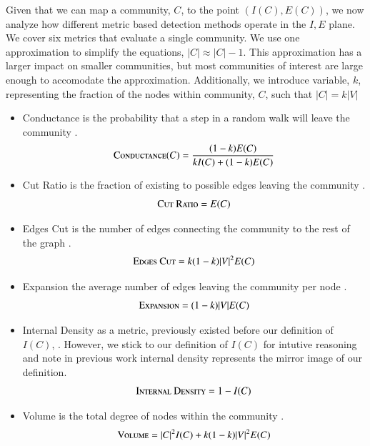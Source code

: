 \documentclass[phd,tocprelim]{cornell}
\begin{document}
Given that we can map a community, $C$, to the point $(I(C), E(C))$, we now analyze how different metric based detection methods operate in the $I,E$ plane.  We cover six metrics that evaluate a single community.  We use one approximation to simplify the equations, $|C| \approx |C| - 1$.  This approximation has a larger impact on smaller communities, but most communities of interest are large enough to accomodate the approximation.  Additionally, we introduce variable, $k$, representing the fraction of the nodes within community, $C$, such that $|C| = k |V|$
\begin{itemize}
\item {\sc Conductance} is the probability that a step in a random walk will leave the community \cite{}.
\begin{equation}
\mbox{\sc Conductance}(C) = \frac{(1 - k)E(C)}{kI(C) + (1 - k)E(C)}
\end{equation}
\item {\sc Cut Ratio} is the fraction of existing to possible edges leaving the community \cite{}.
\begin{equation}
\mbox{\sc Cut Ratio} = E(C)
\end{equation}
\item {\sc Edges Cut} is the number of edges connecting the community to the rest of the graph \cite{}.\begin{equation}
\mbox{\sc Edges Cut} = k (1-k) |V|^2 E(C)
\end{equation}
\item {\sc Expansion} the average number of edges leaving the community per node \cite{}.
\begin{equation}
\mbox{\sc Expansion} = (1 - k)|V |E(C)
\end{equation}
\item {\sc Internal Density} as a metric, previously existed before our definition of $I(C)$, \cite{}.  However, we stick to our definition of $I(C)$ for intutive reasoning and note in previous work internal density represents the mirror image of our definition.
\begin{equation}
\mbox{\sc Internal Density} = 1 - I(C)
\end{equation}
\item {\sc Volume} is the total degree of nodes within the community \cite{}.
\begin{equation}
\mbox{\sc Volume} = |C|^2 I(C) + k(1-k)|V|^2E(C)
\end{equation}
\end{itemize}
\end{document}
